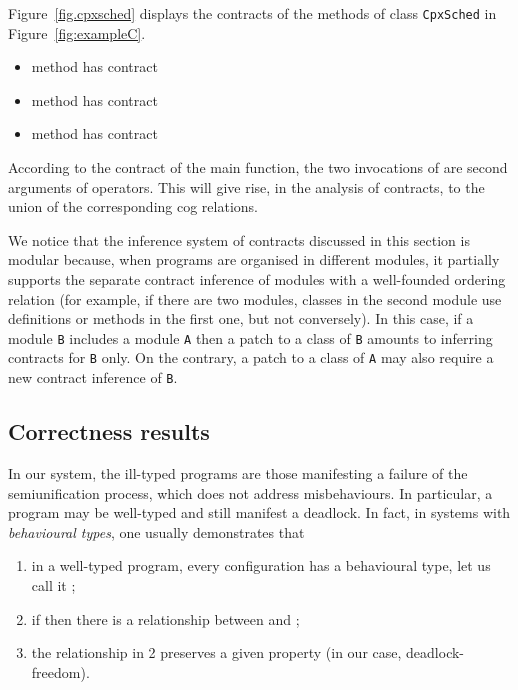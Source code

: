 \begin{example}Figure~\ref{fig.cpxsched} displays the contracts of the methods of class 
{\tt CpxSched} in Figure~\ref{fig:exampleC}.
\begin{figure*}
  \begin{itemize}
  \item method  has contract
    {\footnotesize}
  \item method  has contract
    {\footnotesize}
  \item method  has contract
        {\footnotesize}
  \end{itemize}
\caption{\label{fig.cpxsched} Contracts of {\tt CpxSched}.}
\end{figure*}

According to the contract of the main function, the two invocations of  are
second arguments of  operators. This will give rise, in the analysis 
of contracts, to the union of the corresponding cog relations.  
\end{example}

We notice that the inference system of contracts discussed in this section is
modular because, when programs are organised in different modules, it partially supports the separate contract inference of modules with a 
well-founded ordering relation (for example, if there are two modules, classes in the 
second module use definitions or methods in the first one, but not conversely).
In this case, if a module {\tt B} includes a module
{\tt A} then a patch to a class of {\tt B} amounts to inferring contracts for {\tt B} only. 
On the contrary, a patch to a class of {\tt A} may also require a new contract inference
of {\tt B}.

\subsection{Correctness results}

In our system, the ill-typed programs are those manifesting a failure of
the semiunification process, which does not address misbehaviours. In particular,
a program may be well-typed and still manifest a deadlock. In fact, in systems
with \emph{behavioural types}, one usually demonstrates that
\begin{enumerate}
\item
in a well-typed program, 
every configuration  has a behavioural type, let us call it ;
\item
if   then there is a relationship between
 and ;
\item
the relationship in 2 preserves a given property (in our case, deadlock-freedom).
\end{enumerate}

